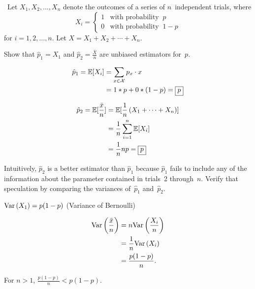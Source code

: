\begin{problem}
  ~Let ${X_1,X_2,\ldots,X_n}$  denote the outcomes of a series of $n$~independent trials, where
  \begin{equation*}
    X_i =   \begin{cases}
              1 & \text{with probability }~p \\
              0 & \text{with probability }~1 - p
            \end{cases}
  \end{equation*}
  \noindent
  for ${i=1,2,\ldots,n}$. Let ${X = X_1 + X_2 + \cdots + X_n}$.
\end{problem}

\begin{subproblem}
  Show that $\hat{p}_1 = X_1$ and ${\hat{p}_2 = \frac{\bar{X}}{n}}$ are unbiased estimators for~$p$.
\end{subproblem}

\begin{align*}
  \hat{p}_1 = \mathbb{E}\lbrack X_i\rbrack &= \sum_{x \in \mathcal{X}} p_x \cdot x \\
                            &= 1 * p + 0 * (1 - p) =\boxed{p}
\end{align*}

\begin{align*}
  \hat{p}_2 = \mathbb{E}\lbrack\frac{\bar{x}}{n}\rbrack &= \mathbb{E}\lbrack\frac{1}{n} \left(X_1 + \cdots + X_n\right)\rbrack \\
                                          &= \frac{1}{n} \sum_{i=1}^{n} \mathbb{E}\lbrack X_i\rbrack \\
                                          &= \frac{1}{n} np = \boxed{p}
\end{align*}

\begin{subproblem}
  Intuitively, $\hat{p}_2$ is a better estimator than $\hat{p}_1$ because $\hat{p}_1$ fails to include any of the information about the parameter contained in trials~2 through~$n$. Verify that speculation by comparing the variances of~$\hat{p}_1$ and~$\hat{p}_2$.
\end{subproblem}

$\text{Var}\left(X_1\right) = p(1-p)$ (Variance of Bernoulli)

\begin{align}
  \text{Var}\left(\frac{\bar{x}}{n}\right) &= n \text{Var}\left(\frac{X_i}{n}\right) \\
                          &= \frac{1}{n} \text{Var}\left(X_i\right) \\
                          &= \frac{p(1-p)}{n} \text{.}
\end{align}

For ${n > 1}$, ${\frac{p(1-p)}{n} < p(1-p)}$.
